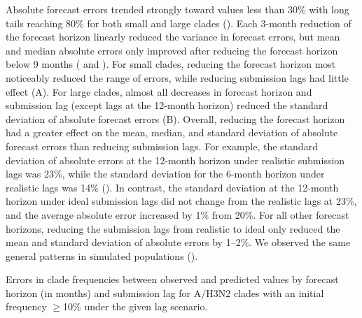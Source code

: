\documentclass[9pt,lineno]{elife}
\begin{document}
Absolute forecast errors trended strongly toward values less than 30\% with long tails reaching 80\% for both small and large clades ().
Each 3-month reduction of the forecast horizon linearly reduced the variance in forecast errors, but mean and median absolute errors only improved after reducing the forecast horizon below 9 months ( and ).
For small clades, reducing the forecast horizon most noticeably reduced the range of errors, while reducing submission lags had little effect (A).
For large clades, almost all decreases in forecast horizon and submission lag (except lags at the 12-month horizon) reduced the standard deviation of absolute forecast errors (B).
Overall, reducing the forecast horizon had a greater effect on the mean, median, and standard deviation of absolute forecast errors than reducing submission lags.
For example, the standard deviation of absolute errors at the 12-month horizon under realistic submission lags was 23\%, while the standard deviation for the 6-month horizon under realistic lags was 14\% ().
In contrast, the standard deviation at the 12-month horizon under ideal submission lags did not change from the realistic lags at 23\%, and the average absolute error increased by 1\% from 20\%.
For all other forecast horizons, reducing the submission lags from realistic to ideal only reduced the mean and standard deviation of absolute errors by 1--2\%.
We observed the same general patterns in simulated populations ().

\begin{table}[htb]
  \begin{center}
    
    \caption{Errors in clade frequencies between observed and predicted values by forecast horizon (in months) and submission lag for A/H3N2 clades with an initial frequency $\geq$10\% under the given lag scenario.}
    \label{tab:h3n2_forecast_clade_frequency_errors}
  \end{center}
\end{table}
\end{document}
